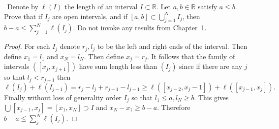 \documentclass[11pt]{amsart}
\def\reals{{\mathbb R}}
\begin{document}
\medskip {}\ 
Denote by $\ell(I)$ the length of an interval $I\subset\reals$.
Let $a,b\in\reals$ satisfy $a\le b$.
Prove
that if $I_j$ are open intervals, and if $[a,b]\subset\bigcup_{j=1}^N I_j$,
then $b-a\le \sum_{j=1}^N \ell(I_j)$.
Do not invoke any results from Chapter~1.
\begin{proof}
	For each $I_j$ denote $r_j, l_j$ to be the left and right ends of the interval. Then define $x_1 = l_1$ and $x_N = l_N$. Then define $x_j = r_j$. It follows that the family of intervals $([x_j, x_{j+1}])$ have sum length less than $(I_j)$ since if there are any $j$ so that $l_j < r_{j-1}$ then $\ell(I_{j}) + \ell(I_{j-1}) = r_j - l_j + r_{j-1} -  l_{j-1} \geq \ell([x_{j-2}, x_j-1]) + \ell([x_{j-1}, x_j]).$ Finally without loss of generality order $I_j$ so that $l_1 \leq a, l_N \geq b$. This gives $\bigcup [x_{j-1}, x_{j}] = [x_1, x_N] \supset I$ and $x_N - x_1 \geq b-a$. Therefore $b-a \leq \sum_{j}^N \ell(I_j)$.
\end{proof}
\end{document}
